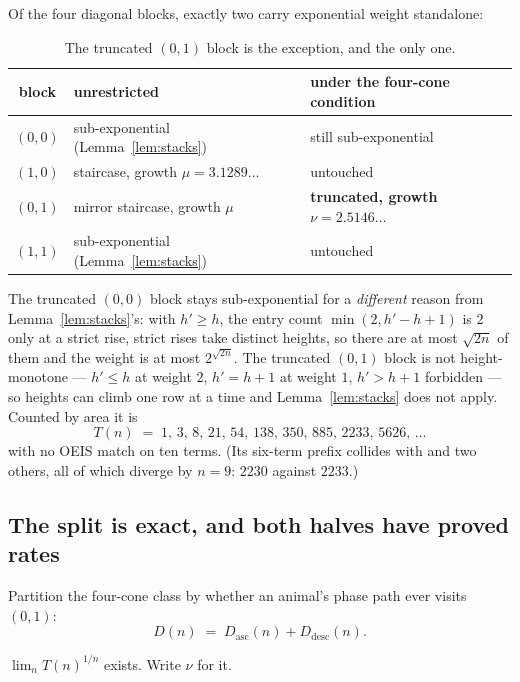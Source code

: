 \documentclass[11pt]{article}
\begin{document}
Of the four diagonal blocks, exactly two carry exponential weight standalone:

\begin{table}[H]
\centering\small
\begin{tabular}{c l l}
\toprule
block & unrestricted & under the four-cone condition \\
\midrule
$(0,0)$ & sub-exponential (Lemma~\ref{lem:stacks}) & still sub-exponential \\
$(1,0)$ & staircase, growth $\mu = 3.1289\dots$ & untouched \\
$(0,1)$ & mirror staircase, growth $\mu$ & \textbf{truncated, growth $\nu = 2.5146\dots$} \\
$(1,1)$ & sub-exponential (Lemma~\ref{lem:stacks}) & untouched \\
\bottomrule
\end{tabular}
\caption{The truncated $(0,1)$ block is the exception, and the only one.}
\label{tab:subdom}
\end{table}

The truncated $(0,0)$ block stays sub-exponential for a \emph{different} reason
from Lemma~\ref{lem:stacks}'s: with $h' \ge h$, the entry count
$\min(2, h'-h+1)$ is $2$ only at a strict rise, strict rises take distinct
heights, so there are at most $\sqrt{2n}$ of them and the weight is at most
$2^{\sqrt{2n}}$. The truncated $(0,1)$ block is not height-monotone --- $h' \le
h$ at weight $2$, $h' = h+1$ at weight $1$, $h' > h+1$ forbidden --- so heights
can climb one row at a time and Lemma~\ref{lem:stacks} does not apply. Counted
by area it is
\[
  T(n) \;=\; 1,\, 3,\, 8,\, 21,\, 54,\, 138,\, 350,\, 885,\, 2233,\, 5626,\, \dots
\]
with no OEIS match on ten terms. (Its six-term prefix collides with
 and two others, all of which diverge by $n = 9$: $2230$ against
$2233$.)

\subsection{The split is exact, and both halves have proved rates}

Partition the four-cone class by whether an animal's phase path ever visits
$(0,1)$:
\[
  D(n) \;=\; D_{\mathrm{asc}}(n) + D_{\mathrm{desc}}(n).
\]

\begin{lemma}
\label{lem:T}
$\lim_n T(n)^{1/n}$ exists. Write $\nu$ for it.
\end{lemma}
\end{document}

